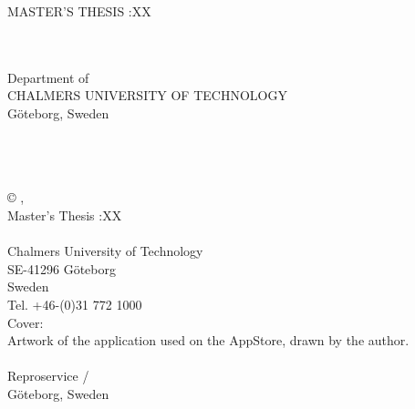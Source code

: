 \begin{titlepage}
\begin{center}

MASTER'S THESIS \thesisyear:XX\\
\vspace{5cm} 
\huge{\thesistitle}\\ 
\vspace{0.5cm} 
\huge{\thesissubtitle}\\
\vspace{1cm} 
\LARGE{\thesisauthor}

\vspace{9.7cm}
\enlargethispage{2cm}
\normalsize{
Department of \thesisdepartment\\
CHALMERS UNIVERSITY OF TECHNOLOGY\\
G\"oteborg, Sweden \thesisyear}

\end{center}
\end{titlepage}

\thispagestyle{empty}
\noindent
\thesistitle\\
\thesissubtitle\\
\thesisauthor
\vspace{\baselineskip}\\
\copyright \hspace{1ex} \thesisauthor, \thesisyear
\vspace{3cm}\\
Master's Thesis \thesisyear:XX
\vspace{\baselineskip}\\
\thesisdepartment\\
Chalmers University of Technology\\
SE-41296 G\"oteborg\\
Sweden
\vspace{\baselineskip}\\
Tel.	+46-(0)31 772 1000
\enlargethispage{2cm}
\vspace{10cm}\\
Cover:\\
Artwork of the application used on the AppStore, drawn by the author.\\
\vspace{0cm}\\
Reproservice / \thesisrepro\\
G\"oteborg, Sweden \thesisyear


